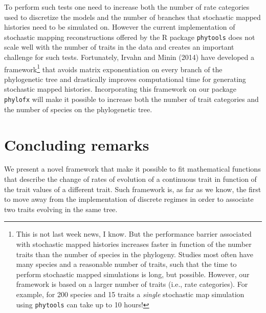 To perform such tests one need to increase both the number of rate categories used to discretize the models and the number of branches that stochastic mapped histories need to be simulated on. However the current implementation of stochastic mapping reconstructions offered by the R package \texttt{phytools} does not scale well with the number of traits in the data and creates an important challenge for such tests. Fortunately, Irvahn and Minin (2014) have developed a framework\footnote{This is not last week news, I know. But the performance barrier associated with stochastic mapped histories increases faster in function of the number traits than the number of species in the phylogeny. Studies most often have many species and a reasonable number of traits, such that the time to perform stochastic mapped simulations is long, but possible. However, our framework is based on a larger number of traits (i.e., rate categories). For example, for 200 species and 15 traits a \textit{single} stochastic map simulation using \texttt{phytools} can take up to 10 hours!} that avoids matrix exponentiation on every branch of the phylogenetic tree and drastically improves computational time for generating stochastic mapped histories. Incorporating this framework on our package \texttt{phylofx} will make it possible to increase both the number of trait categories and the number of species on the phylogenetic tree.

\section{Concluding remarks}

We present a novel framework that make it possible to fit mathematical functions that describe the change of rates of evolution of a continuous trait in function of the trait values of a different trait. Such framework is, as far as we know, the first to move away from the implementation of discrete regimes in order to associate two traits evolving in the same tree.


